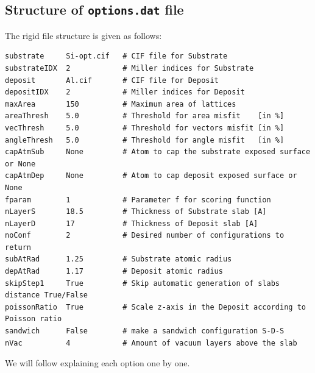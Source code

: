 \documentclass[a4paper,12pt,oneside]{article}
\begin{document}
\subsection{Structure of \texttt{options.dat} file}
The rigid file structure is given as follows:
{\small
\begin{verbatim}
substrate     Si-opt.cif   # CIF file for Substrate
substrateIDX  2            # Miller indices for Substrate
deposit       Al.cif       # CIF file for Deposit
depositIDX    2            # Miller indices for Deposit
maxArea       150          # Maximum area of lattices
areaThresh    5.0          # Threshold for area misfit    [in %]
vecThresh     5.0          # Threshold for vectors misfit [in %]
angleThresh   5.0          # Threshold for angle misfit   [in %]
capAtmSub     None         # Atom to cap the substrate exposed surface or None
capAtmDep     None         # Atom to cap deposit exposed surface or None
fparam        1            # Parameter f for scoring function
nLayerS       18.5         # Thickness of Substrate slab [A]
nLayerD       17           # Thickness of Deposit slab [A]
noConf        2            # Desired number of configurations to return
subAtRad      1.25         # Substrate atomic radius
depAtRad      1.17         # Deposit atomic radius
skipStep1     True         # Skip automatic generation of slabs distance True/False
poissonRatio  True         # Scale z-axis in the Deposit according to Poisson ratio
sandwich      False        # make a sandwich configuration S-D-S
nVac          4            # Amount of vacuum layers above the slab
\end{verbatim}
}
\noindent
We will follow explaining each option one by one.
\end{document}
